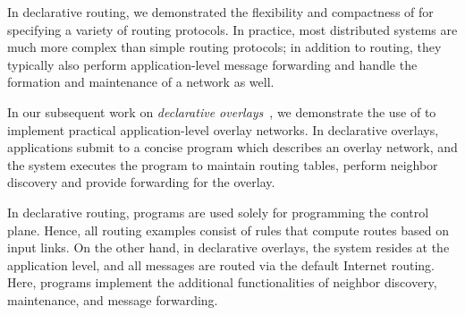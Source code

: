 In declarative routing, we demonstrated the flexibility and
compactness of \Dlog for specifying a variety of routing protocols.
In practice, most distributed systems are much more complex than
simple routing protocols; in addition to routing, they typically also
perform application-level message forwarding and handle the formation
and maintenance of a network as well.


In our subsequent work on {\em declarative
  overlays}~\cite{declareOverlays}, we demonstrate the use of \Dlog to
implement practical application-level overlay networks. In declarative
overlays, applications submit to \Sys a concise \Dlog program which
describes an overlay network, and the \Sys system executes the program
to maintain routing tables, perform neighbor discovery and provide
forwarding for the overlay.


In declarative routing, \Dlog programs are used solely for programming
the control plane. Hence, all routing examples consist of \Dlog rules
that compute routes based on input links. On the other hand, in
declarative overlays, the \Sys system resides at the application
level, and all messages are routed via the default Internet
routing. Here, \Dlog programs implement the additional functionalities
of neighbor discovery, maintenance, and message forwarding. 

